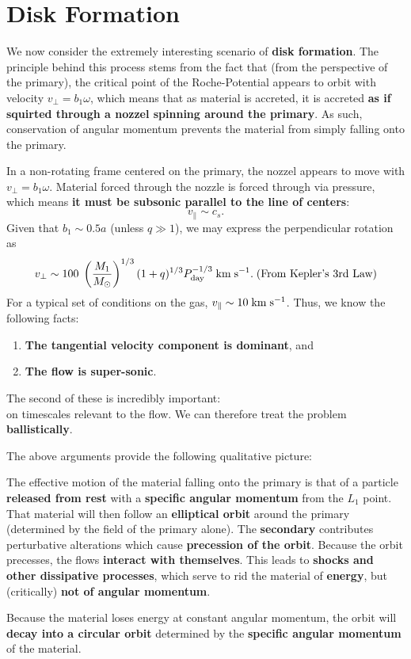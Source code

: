 \section{Disk Formation}

We now consider the extremely interesting scenario of \textbf{disk formation}. The principle behind this process stems from the fact that (from the perspective of the primary), the critical point of the Roche-Potential appears to orbit with velocity $v_\perp = b_1\omega$, which means that as material is accreted, it is accreted \textbf{as if squirted through a nozzel spinning around the primary}. As such, conservation of angular momentum prevents the material from simply falling onto the primary.
\par
In a non-rotating frame centered on the primary, the nozzel appears to move with $v_\perp = b_1\omega$. Material forced through the nozzle is forced through via pressure, which means \textbf{it must be subsonic parallel to the line of centers}:
\[
v_\parallel \sim c_s.
\]
Given that $b_1 \sim 0.5a$ (unless $q \gg 1$), we may express the perpendicular rotation as
\[
v_\perp \sim 100\; \left(\frac{M_1}{M_\odot}\right)^{1/3} (1+q)^{1/3} P_{\rm day}^{-1/3} \;{\rm km\;s^{-1}}.\;\text{(From Kepler's 3rd Law)}
\]
For a typical set of conditions on the gas, $v_\parallel \sim 10\;{\rm km\;s^{-1}}$. Thus, we know the following facts:
\begin{enumerate}
    \item \textbf{The tangential velocity component is dominant}, and
    \item \textbf{The flow is super-sonic}.
\end{enumerate}
The second of these is incredibly important:\\
 on timescales relevant to the flow. We can therefore treat the problem \textbf{ballistically}.
\par
The above arguments provide the following qualitative picture:
\vspace{0.5cm}
\begin{bigidea}
    The effective motion of the material falling onto the primary is that of a particle \textbf{released from rest} with a \textbf{specific angular momentum} from the $L_1$ point. That material will then follow an \textbf{elliptical orbit} around the primary (determined by the field of the primary alone). The \textbf{secondary} contributes perturbative alterations which cause \textbf{precession of the orbit}. Because the orbit precesses, the flows \textbf{interact with themselves}. This leads to \textbf{shocks and other dissipative processes}, which serve to rid the material of \textbf{energy}, but (critically) \textbf{not of angular momentum}. 
\par
Because the material loses energy at constant angular momentum, the orbit will \textbf{decay into a circular orbit} determined by the \textbf{specific angular momentum} of the material.
\end{bigidea}
